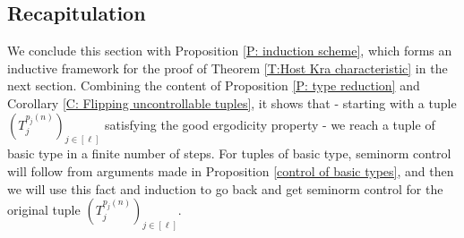 \documentclass[11pt]{amsart}
\theoremstyle{definition}
\newcommand{\brac}[1]{\mathopen{}\left( #1 \mathclose{}\right)}
\begin{document}
\subsection{Recapitulation}\label{SS:recapitulation}
We conclude this section with Proposition \ref{P: induction scheme}, which forms an inductive framework for the proof of Theorem \ref{T:Host Kra characteristic} in the next section. Combining the content of Proposition \ref{P: type reduction} and Corollary \ref{C: Flipping uncontrollable tuples}, it shows that - starting with a tuple $\brac{T_j^{p_j(n)}}_{j\in[\ell]}$ satisfying the good ergodicity property - we reach a tuple of basic type in a finite number of steps. For tuples of basic type, seminorm control will follow from arguments made in Proposition \ref{control of basic types}, and then we will use this fact and induction to go back and get seminorm control for the original tuple $\brac{T_j^{p_j(n)}}_{j\in[\ell]}$.
\end{document}
